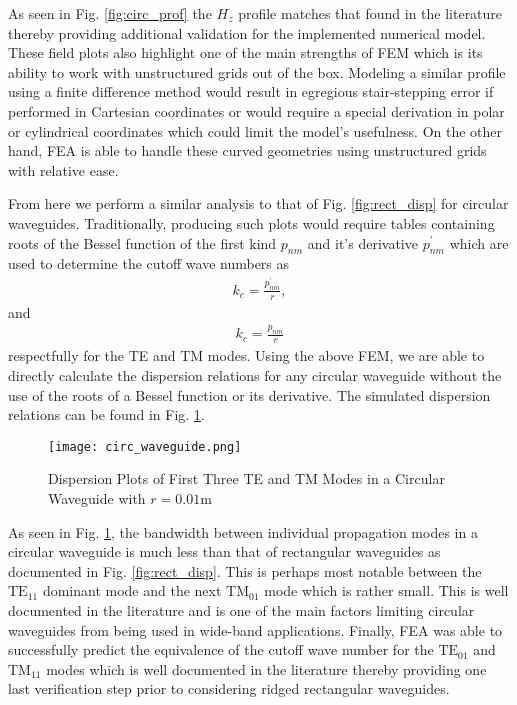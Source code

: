 As seen in Fig. \ref{fig:circ_prof} the $H_z$ profile matches that found in the literature \cite{pozar2011microwave} thereby providing additional validation for the implemented numerical model. These field plots also highlight one of the main strengths of FEM which is its ability to work with unstructured grids out of the box. Modeling a similar profile using a finite difference method would result in egregious stair-stepping error if performed in Cartesian coordinates or would require a special derivation in polar or cylindrical coordinates which could limit the model's usefulness. On the other hand, FEA is able to handle these curved geometries using unstructured grids with relative ease. 

From here we perform a similar analysis to that of Fig. \ref{fig:rect_disp} for circular waveguides. Traditionally, producing such plots would require tables containing roots of the Bessel function of the first kind $p_{nm}$ and it's derivative $p^{'}_{nm}$ which are used to determine the cutoff wave numbers as
\begin{align}
	k_c = \frac{p^{'}_{nm}}{r},
\end{align}
and
\begin{align}
	k_c = \frac{p_{nm}}{r}
\end{align}
respectfully for the TE and TM modes. Using the above FEM, we are able to directly calculate the dispersion relations for any circular waveguide without the use of the roots of a Bessel function or its derivative. The simulated dispersion relations can be found in Fig. \ref{fig:circ_disp}.

\begin{figure}[h!]  
	\centering
	\texttt{[image: circ\_waveguide.png]} 
	\caption{Dispersion Plots of First Three TE and TM Modes in a Circular Waveguide with $r=0.01$m}
	\label{fig:circ_disp}
\end{figure}

As seen in Fig. \ref{fig:circ_disp}, the bandwidth between individual propagation modes in a circular waveguide is much less than that of rectangular waveguides as documented in Fig. \ref{fig:rect_disp}. This is perhaps most notable between the $\mathrm{TE}_{11}$ dominant mode and the next $\mathrm{TM}_{01}$ mode which is rather small. This is well documented in the literature \cite{cadencecircular} and is one of the main factors limiting circular waveguides from being used in wide-band applications. Finally, FEA was able to successfully predict the equivalence of the cutoff wave number for the  $\mathrm{TE}_{01}$ and $\mathrm{TM}_{11}$ modes which is well documented in the literature \cite{pozar2011microwave} thereby providing one last verification step prior to considering ridged rectangular waveguides.

